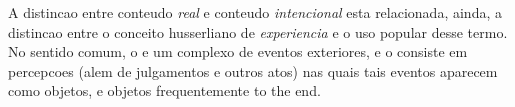 A distincao entre conteudo \emph{real} e conteudo
  \emph{intencional} esta relacionada, ainda, a
  distincao entre o conceito husserliano de
  \emph{experiencia} e o uso popular desse termo.
No sentido comum, o  e um
  complexo de eventos exteriores, e o
   consiste em percepcoes (alem
  de julgamentos e outros atos) nas quais tais
  eventos aparecem como objetos, e objetos
  frequentemente to the end.
